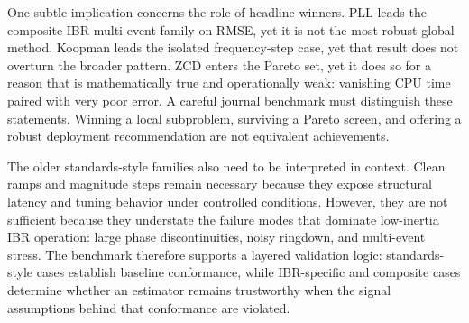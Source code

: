 One subtle implication concerns the role of headline winners. PLL leads the composite IBR multi-event family on RMSE, yet it is not the most robust global method. Koopman leads the isolated frequency-step case, yet that result does not overturn the broader pattern. ZCD enters the Pareto set, yet it does so for a reason that is mathematically true and operationally weak: vanishing CPU time paired with very poor error. A careful journal benchmark must distinguish these statements. Winning a local subproblem, surviving a Pareto screen, and offering a robust deployment recommendation are not equivalent achievements.

The older standards-style families also need to be interpreted in context. Clean ramps and magnitude steps remain necessary because they expose structural latency and tuning behavior under controlled conditions. However, they are not sufficient because they understate the failure modes that dominate low-inertia IBR operation: large phase discontinuities, noisy ringdown, and multi-event stress. The benchmark therefore supports a layered validation logic: standards-style cases establish baseline conformance, while IBR-specific and composite cases determine whether an estimator remains trustworthy when the signal assumptions behind that conformance are violated.
